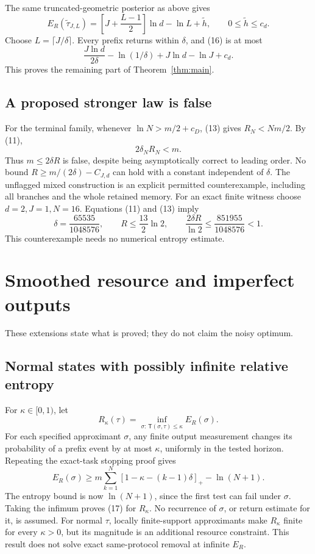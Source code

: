 \documentclass[11pt,a4paper]{article}
\newcommand{\ER}{E_R}
\newcommand{\dist}{\mathsf T}
\begin{document}
The same truncated-geometric posterior as above gives
\[
 \boxed{\ 
 \ER(\widetilde\tau_{J,L})
 =\left[J+\frac{L-1}{2}\right]\ln d-\ln L+\widetilde h,\qquad
                         0\le\widetilde h\le c_d .
 \ }                                                       \tag{16}
\]
Choose \(L=\lceil J/\delta\rceil\).
Every prefix returns within \(\delta\), and (16) is at most
\[
 \frac{J\ln d}{2\delta}-\ln(1/\delta)+J\ln d-\ln J+c_d.
\]
This proves the remaining part of Theorem~\ref{thm:main}.

\subsection{A proposed stronger law is false}
For the terminal family, whenever \(\ln N>m/2+c_D\), (13) gives
\(R_N<Nm/2\). By (11),
\[
 2\delta_NR_N<m.
\]
Thus \(m\le2\delta R\) is false, despite being asymptotically correct to leading
order. No bound \(R\ge m/(2\delta)-C_{J,d}\) can hold with a constant independent
of \(\delta\). The unflagged mixed construction is an explicit permitted
counterexample, including all branches and the whole retained memory.
For an exact finite witness choose \(d=2,J=1,N=16\). Equations (11) and
(13) imply
\[
 \delta=\frac{65535}{1048576},\qquad
 R\le\frac{13}{2}\ln2,\qquad
 \frac{2\delta R}{\ln2}\le\frac{851955}{1048576}<1.
\]
This counterexample needs no numerical entropy estimate.

\section{Smoothed resource and imperfect outputs}
These extensions state what is proved; they do not claim the noisy optimum.

\subsection{Normal states with possibly infinite relative entropy}
For \(\kappa\in[0,1)\), let
\[
 R_\kappa(\tau)=
   \inf_{\sigma:\,\dist(\sigma,\tau)\le\kappa}\ER(\sigma).
\]
For each specified approximant \(\sigma\), any finite output measurement
changes its probability of a prefix event by at most \(\kappa\), uniformly
in the tested horizon. Repeating the exact-task stopping proof gives
\[
 \ER(\sigma)\ge
 m\sum_{k=1}^N[1-\kappa-(k-1)\delta]_+-\ln(N+1).             \tag{17}
\]
The entropy bound is now \(\ln(N+1)\), since the first test can fail under
\(\sigma\). Taking the infimum proves (17) for \(R_\kappa\).
No recurrence of \(\sigma\), or return estimate for it, is assumed.
For normal \(\tau\), locally finite-support approximants make \(R_\kappa\)
finite for every \(\kappa>0\), but its magnitude is an additional resource
constraint. This result does not solve exact same-protocol removal at
infinite \(\ER\).
\end{document}
